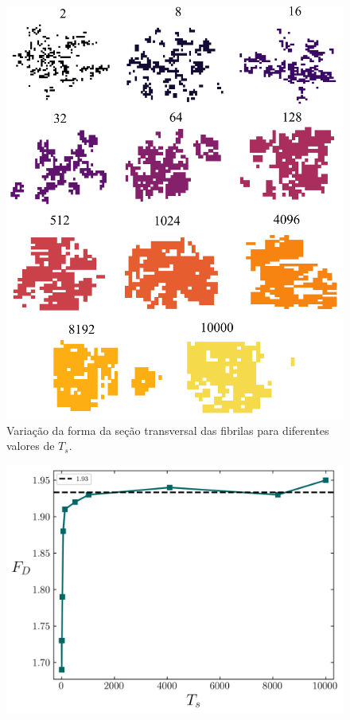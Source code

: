 \documentclass{article}
\begin{document}
\begin{figure}[H]
    \centering
    \includegraphics[width=\textwidth]{figures/cs_all.png}
    \caption{Variação da forma da seção transversal das fibrilas para diferentes valores de $T_{s}$.} 
    \label{R3}
\end{figure}

\begin{figure}[H]
    \centering
    \includegraphics[width=\textwidth]{figures/dim_frac.png}

    \caption{ } 

    \label{R4}
\end{figure}
\end{document}
